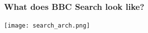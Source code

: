 \documentclass{beamer}
\begin{document}

\begin{frame}
  \frametitle{What does BBC Search look like?}
  \texttt{[image: search\_arch.png]}\\
\end{frame}
\end{document}

